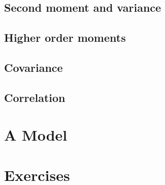 \subsection{Second moment and variance}

\subsection{Higher order moments}

\subsection{Covariance}

\subsection{Correlation}


\section{A Model}




\section{Exercises}

